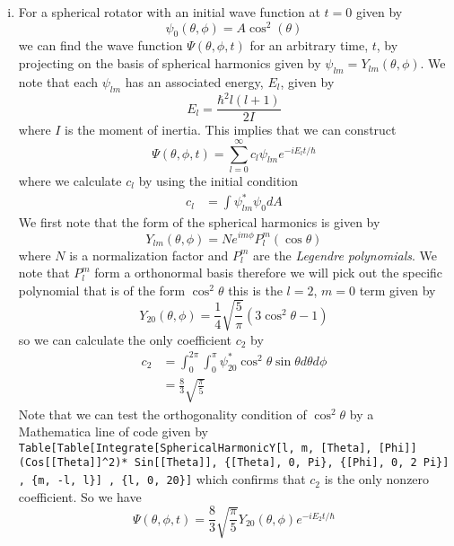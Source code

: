 \documentclass[11pt]{article}
\numberwithin{equation}{section}
\begin{document}
\begin{enumerate}[(i)]
\item For a spherical rotator with an initial wave function at $t=0$ given by
$$\psi_0(\theta,\phi) = A\cos^2(\theta)$$
we can find the wave function $\Psi(\theta,\phi,t)$ for an arbitrary time, $t$, by 
projecting on the basis of spherical harmonics given by $\psi_{lm} = Y_{lm}(\theta,\phi)$. 
We note that each $\psi_{lm}$ has an associated energy, $E_{l}$, given by
$$E_l = \frac{\hbar^2l(l+1)}{2I}$$
where $I$ is the moment of inertia. This implies that we can construct
$$\Psi(\theta,\phi,t) = \sum_{l=0}^{\infty}c_l\psi_{lm}e^{-iE_lt/\hbar}$$
where we calculate $c_l$ by using the initial condition
\begin{align*}
c_l &= \int\psi_{lm}^*\psi_0 dA
\end{align*}
We first note that the form of the spherical harmonics is given by
$$Y_{lm}(\theta, \phi) = Ne^{im\phi}P_l^m(\cos\theta)$$
where $N$ is a normalization factor and $P_l^m$ are the \emph{Legendre polynomials}. We note
that $P_l^m$ form a orthonormal basis therefore we will pick out the specific polynomial 
that is of the form $\cos^2\theta$ this is the $l=2$, $m=0$ term given by
$$Y_{20}(\theta,\phi) = \frac{1}{4}\sqrt{\frac{5}{\pi}}\left(3\cos^2\theta-1\right)$$
so we can calculate the only coefficient $c_2$ by
\begin{align*}
c_2 &= \int_{0}^{2\pi}\int_{0}^{\pi}\psi_{20}^*\cos^2\theta\sin\theta d\theta d\phi\\
&= \frac{8}{3}\sqrt{\frac{\pi}{5}}
\end{align*}
Note that we can test the orthogonality condition of $\cos^2\theta$ by a Mathematica line of
code given by \texttt{Table[Table[Integrate[SphericalHarmonicY[l, m, [Theta], [Phi]]\*(Cos[[Theta]]\string^2)* Sin[[Theta]], \{[Theta], 0, Pi\}, \{[Phi], 0, 2 Pi\}] , \{m, -l, l\}] , \{l, 0, 20\}]}
which confirms that $c_2$ is the only nonzero coefficient. So we have
$$\Psi(\theta,\phi,t) = \frac{8}{3}\sqrt{\frac{\pi}{5}}Y_{20}(\theta,\phi)e^{-iE_2t/\hbar}$$
\end{enumerate}
\pagebreak
\end{document}
